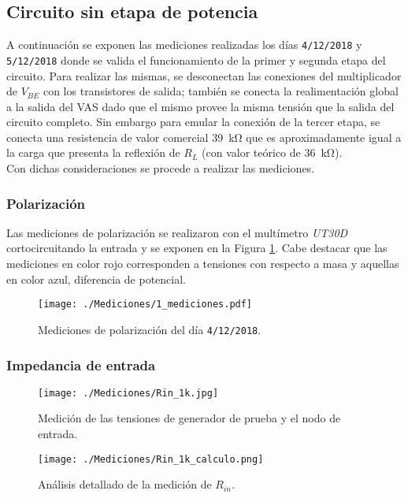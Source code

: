 
	\subsection{Circuito sin etapa de potencia}
		A continuación se exponen las mediciones realizadas los días \texttt{4/12/2018} y \texttt{5/12/2018} donde se valida el funcionamiento de la primer y segunda etapa del circuito. Para realizar las mismas, se desconectan las conexiones del multiplicador de $V_{BE}$ con los transistores de salida; también se conecta la realimentación global a la salida del VAS dado que el mismo provee la misma tensión que la salida del circuito completo. Sin embargo para emular la conexión de la tercer etapa, se conecta una resistencia de valor comercial \SI{39}{\kilo\ohm} que es aproximadamente igual a la carga que presenta la reflexión de $R_L$ (con valor teórico de \SI{36}{\kilo\ohm}).\\
		\indent Con dichas consideraciones se procede a realizar las mediciones.

		\subsubsection{Polarización}
		
		Las mediciones de polarización se realizaron con el multímetro \emph{UT30D} cortocircuitando la entrada y se exponen en la Figura \ref{fig:51218_pol}. Cabe destacar que las mediciones en color rojo corresponden a tensiones con respecto a masa y aquellas en color azul, diferencia de potencial.
		\begin{figure}[h!]
			\centering
			\texttt{[image: ./Mediciones/1\_mediciones.pdf]}
			\caption{Mediciones de polarización del día \texttt{4/12/2018}.}
			\label{fig:51218_pol}
		\end{figure}

		\subsubsection{Impedancia de entrada}
			
		\begin{figure}[ H]
			\centering
			\texttt{[image: ./Mediciones/Rin\_1k.jpg]}
			\caption{Medición de las tensiones de generador de prueba y el nodo de entrada.}
			\label{fig:rin_med}
		\end{figure}

		\begin{figure}[ H]
			\centering
			\texttt{[image: ./Mediciones/Rin\_1k\_calculo.png]}
			\caption{Análisis detallado de la medición de $R_{in}$.}
			\label{fig:analisis_rin_med}
		\end{figure}

